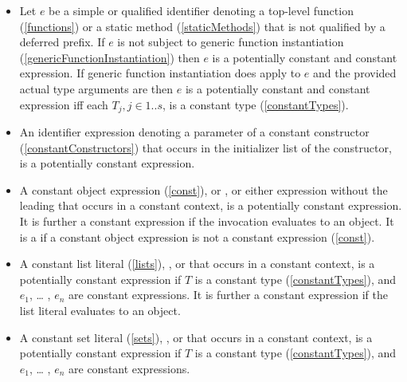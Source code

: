 \documentclass[makeidx]{article}
\begin{document}
{\begin{itemize}
{    the expression  is a constant,
    and if $C$ is imported with a prefix $p$,  is
    a constant  instance representing the type of $C$
    unless $p$ is a deferred prefix.%
  }
\item
  Let $e$ be a simple or qualified identifier denoting
  a top-level function (\ref{functions})
  or a static method (\ref{staticMethods})
  that is not qualified by a deferred prefix.
  If $e$ is not subject to generic function instantiation
  (\ref{genericFunctionInstantiation})
  then $e$ is a potentially constant and constant expression.
  If generic function instantiation does apply to $e$
  and the provided actual type arguments are 
  then $e$ is a potentially constant and constant expression
  if{}f each $T_j, j \in 1 .. s$, is a constant type
  (\ref{constantTypes}).
\item
  An identifier expression denoting a parameter of a constant constructor
  (\ref{constantConstructors})
  that occurs in the initializer list of the constructor,
  is a potentially constant expression.
\item
  A constant object expression (\ref{const}),
   or
  ,
  or either expression without the leading \CONST{} that occurs in
  a constant context,
  is a potentially constant expression.
  It is further a constant expression if the invocation evaluates to an object.
  It is a  if a constant object expression is
  not a constant expression (\ref{const}).
\item
  A constant list literal (\ref{lists}),
  , or
  that occurs in a constant context,
  is a potentially constant expression if $T$ is a constant type
  (\ref{constantTypes}),
  and $e_1$, \ldots{} , $e_n$ are constant expressions.
  It is further a constant expression
  if the list literal evaluates to an object.
\item
  A constant set literal (\ref{sets}),
  , or
  that occurs in a constant context,
  is a potentially constant expression
  if $T$ is a constant type
  (\ref{constantTypes}),
  and $e_1$, \ldots{} , $e_n$ are constant expressions.

\end{itemize}}
\end{document}
